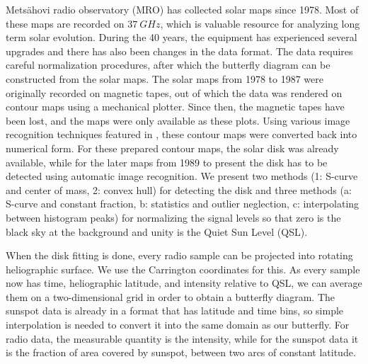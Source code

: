 \documentclass{aa}
\begin{document}
Metsähovi radio observatory (MRO) has collected solar maps since 1978. Most of these maps are recorded on 
$\SI{37}{GHz}$, which is valuable resource for analyzing long term solar evolution.
During the 40 years, the equipment 
has experienced several upgrades and there has also been changes in the data format. The data requires careful 
normalization procedures, after which the butterfly diagram can be constructed from the solar maps. The solar maps from 
1978 to 1987 were originally recorded on magnetic tapes, out of which the data was rendered on contour maps using a 
mechanical plotter. Since then, the magnetic tapes have been lost, and the maps were only available as 
these plots.
Using various image recognition techniques featured in \cite{masterthesis}, these contour maps were converted back into 
numerical form. For these prepared contour maps, 
the solar disk was already available, while for the later maps from 
1989 to present the disk 
has to be detected using automatic image recognition. 
We present two methods (1: S-curve and 
center of mass, 2: convex hull) for detecting the disk and three methods (a: S-curve and constant fraction, b: 
statistics and outlier neglection, c: interpolating between histogram peaks) for normalizing the signal levels so that 
zero is the black sky at the background and unity is the Quiet Sun Level (QSL).

When the disk fitting is done, every radio sample can be projected into rotating heliographic surface. We use the 
Carrington coordinates for this. As every sample now has time, heliographic latitude, and intensity relative to QSL, we 
can average them on a two-dimensional grid in order to obtain a butterfly diagram. The sunspot data is already in a 
format that has latitude and time bins, so simple interpolation is needed to convert it into the same domain as our 
butterfly. For radio data, the measurable quantity is the intensity, while for the sunspot data it is the fraction of 
area covered by sunspot, between two arcs of constant latitude.
\end{document}
